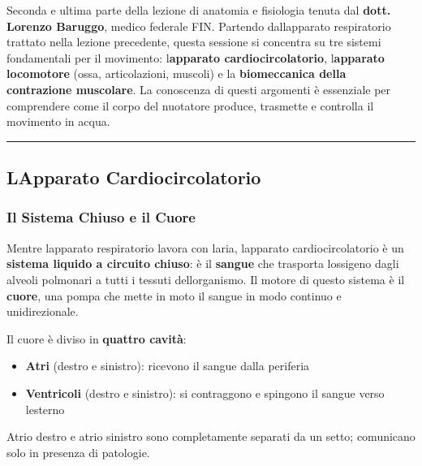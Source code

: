 \documentclass[a4paper,11pt]{article}
\providecommand{\tightlist}{%
  \setlength{\itemsep}{0pt}\setlength{\parskip}{0pt}}
\begin{document}
Seconda e ultima parte della lezione di anatomia e fisiologia tenuta dal
\textbf{dott. Lorenzo Baruggo}, medico federale FIN. Partendo
dall\textquotesingle apparato respiratorio trattato nella lezione
precedente, questa sessione si concentra su tre sistemi fondamentali per
il movimento: l\textquotesingle{}\textbf{apparato cardiocircolatorio},
l\textquotesingle{}\textbf{apparato locomotore} (ossa, articolazioni,
muscoli) e la \textbf{biomeccanica della contrazione muscolare}. La
conoscenza di questi argomenti è essenziale per comprendere come il
corpo del nuotatore produce, trasmette e controlla il movimento in
acqua.

\begin{center}\rule{0.5\linewidth}{0.5pt}\end{center}

\subsection{L\textquotesingle Apparato
      Cardiocircolatorio}\label{lapparato-cardiocircolatorio}

\subsubsection{Il Sistema Chiuso e il
      Cuore}\label{il-sistema-chiuso-e-il-cuore}

Mentre l\textquotesingle apparato respiratorio lavora con
l\textquotesingle aria, l\textquotesingle apparato cardiocircolatorio è
un \textbf{sistema liquido a circuito chiuso}: è il \textbf{sangue} che
trasporta l\textquotesingle ossigeno dagli alveoli polmonari a tutti i
tessuti dell\textquotesingle organismo. Il motore di questo sistema è il
\textbf{cuore}, una pompa che mette in moto il sangue in modo continuo e
unidirezionale.

Il cuore è diviso in \textbf{quattro cavità}:

\begin{itemize}
      \tightlist
      \item
            \textbf{Atri} (destro e sinistro): ricevono il sangue dalla periferia
      \item
            \textbf{Ventricoli} (destro e sinistro): si contraggono e spingono il
            sangue verso l\textquotesingle esterno
\end{itemize}

Atrio destro e atrio sinistro sono completamente separati da un setto;
comunicano solo in presenza di patologie.
\end{document}
